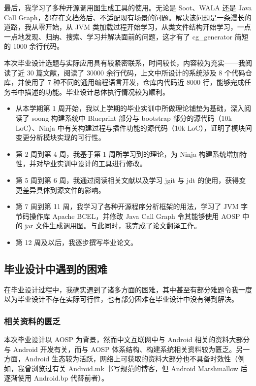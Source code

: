 最后，我学习了多种开源调用图生成工具的使用。无论是 Soot、WALA 还是 Java Call Graph，都存在文档落后、不适配现有场景的问题。解决该问题是一条漫长的道路，我从零开始，从 JVM 类加载过程开始学习，从类文件结构开始学习，一点一点地发现、归纳、搜索、学习并解决面前的问题，这才有了 cg\_generator 简短的 1000 余行代码。

本次毕业设计选题与实际应用具有较紧密联系，时间较长，内容较为充实——我阅读了近 30 篇文献，阅读了 30000 余行代码，上文中所设计的系统涉及 8 个代码仓库，并使用了 7 种不同的通用编程语言开发，仓库内代码近 8000 行，能够完成任务书中描述的功能。毕业设计总体执行情况较为顺利。

\begin{itemize}
    \item 从本学期第 1 周开始，我以上学期的毕业实训中所做理论铺垫为基础，深入阅读了 soong 构建系统中 Blueprint 部分与 bootstrap 部分的源代码（10k LoC）、Ninja 中有关构建过程与插件功能的源代码（10k LoC），证明了模块间变更分析模块实现的可行性。
    \item 第 2 周到第 4 周，我基于第 1 周所学习到的理论，为 Ninja 构建系统增加特性，并对毕业实训中设计的工具进行修改。
    \item 第 5 周到第 6 周，我通过阅读相关文献以及学习 jgit 与 jdt 的使用，获得变更差异具体到源文件的影响。
    \item 第 7 周到第 11 周，我学习了各种开源程序分析框架的用法，学习了 JVM 字节码操作库 Apache BCEL，并修改 Java Call Graph 令其能够使用 AOSP 中的 jar 文件生成调用图。与此同时，我完成了论文翻译工作。
    \item 第 12 周及以后，我逐步撰写毕业论文。
\end{itemize}

\subsection{毕业设计中遇到的困难}

在毕业设计过程中，我确实遇到了诸多方面的困难，其中甚至有部分难题令我一度以为毕业设计不存在实际可行性，也有部分困难在毕业设计中没有得到解决。

\subsubsection{相关资料的匮乏}

本次毕业设计以 AOSP 为背景，然而中文互联网中与 Android 相关的资料大部分与 Android 开发有关，而与 AOSP 体系结构、构建系统相关资料较为匮乏。另一方面，Android 生态较为活跃，网络上可获取的资料大部分也不具备时效性（例如，我曾浏览过有关 Android.mk 书写规范的博客，但 Android Marshmallow 后逐渐使用 Android.bp 代替前者）。

